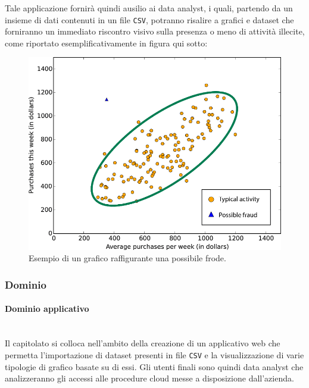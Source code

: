 \documentclass[11pt]{article}
\begin{document}
    Tale applicazione fornirà quindi ausilio ai data analyst, i quali, partendo da un insieme di dati contenuti in un file
    \texttt{CSV}, potranno risalire a grafici e dataset che forniranno un immediato riscontro visivo sulla presenza o meno di attività
    illecite, come riportato esemplificativamente in figura qui sotto:
    
    \bigskip
    
    \begin{figure}[h!]
        \centering
        \includegraphics[scale=0.4]{Res/LoginWarrior.png}
        \caption{Esempio di un grafico raffigurante una possibile frode.}
        \label{zucchetti}
    \end{figure}
    
    \subsubsection{Dominio}
        \paragraph{Dominio applicativo}~\\
        
        \noindent
        Il capitolato si colloca nell'ambito della creazione di un applicativo web che permetta l'importazione di dataset presenti in
        file \texttt{CSV} e la visualizzazione di varie tipologie di grafico basate su di essi.
        Gli utenti finali sono quindi data analyst che analizzeranno gli accessi alle procedure cloud messe a disposizione dall'azienda.
        
\end{document}

